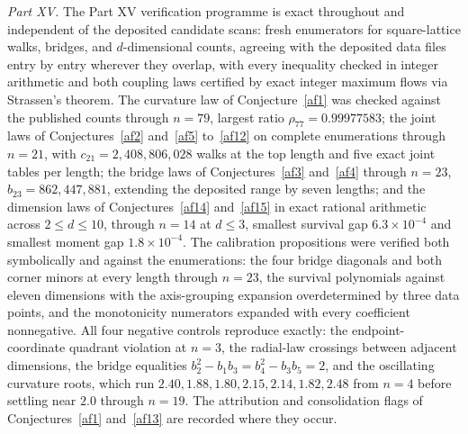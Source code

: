 \documentclass[11pt]{article}
\theoremstyle{definition}
\begin{document}
\emph{Part XV.}  The Part XV verification programme is exact throughout and independent of the deposited candidate scans: fresh enumerators for square-lattice walks, bridges, and $d$-dimensional counts, agreeing with the deposited data files entry by entry wherever they overlap, with every inequality checked in integer arithmetic and both coupling laws certified by exact integer maximum flows via Strassen's theorem.  The curvature law of Conjecture~\ref{af1} was checked against the published counts through $n=79$, largest ratio $\rho_{77}=0.99977583$; the joint laws of Conjectures~\ref{af2} and~\ref{af5} to~\ref{af12} on complete enumerations through $n=21$, with $c_{21}=2{,}408{,}806{,}028$ walks at the top length and five exact joint tables per length; the bridge laws of Conjectures~\ref{af3} and~\ref{af4} through $n=23$, $b_{23}=862{,}447{,}881$, extending the deposited range by seven lengths; and the dimension laws of Conjectures~\ref{af14} and~\ref{af15} in exact rational arithmetic across $2\le d\le10$, through $n=14$ at $d\le3$, smallest survival gap $6.3\times10^{-4}$ and smallest moment gap $1.8\times10^{-4}$.  The calibration propositions were verified both symbolically and against the enumerations: the four bridge diagonals and both corner minors at every length through $n=23$, the survival polynomials against eleven dimensions with the axis-grouping expansion overdetermined by three data points, and the monotonicity numerators expanded with every coefficient nonnegative.  All four negative controls reproduce exactly: the endpoint-coordinate quadrant violation at $n=3$, the radial-law crossings between adjacent dimensions, the bridge equalities $b_2^2-b_1b_3=b_4^2-b_3b_5=2$, and the oscillating curvature roots, which run $2.40,1.88,1.80,2.15,2.14,1.82,2.48$ from $n=4$ before settling near $2.0$ through $n=19$.  The attribution and consolidation flags of Conjectures~\ref{af1} and~\ref{af13} are recorded where they occur.
\end{document}
